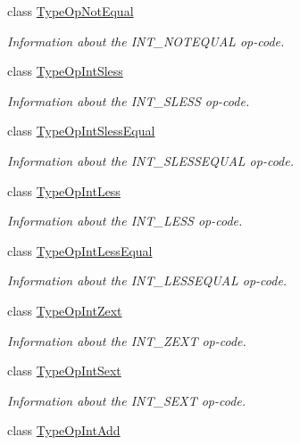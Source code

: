 \begin{DoxyCompactItemize}
class \mbox{\hyperlink{class_type_op_not_equal}{Type\+Op\+Not\+Equal}}
\begin{DoxyCompactList}\small\item\em Information about the I\+N\+T\+\_\+\+N\+O\+T\+E\+Q\+U\+AL op-\/code. \end{DoxyCompactList}\item 
class \mbox{\hyperlink{class_type_op_int_sless}{Type\+Op\+Int\+Sless}}
\begin{DoxyCompactList}\small\item\em Information about the I\+N\+T\+\_\+\+S\+L\+E\+SS op-\/code. \end{DoxyCompactList}\item 
class \mbox{\hyperlink{class_type_op_int_sless_equal}{Type\+Op\+Int\+Sless\+Equal}}
\begin{DoxyCompactList}\small\item\em Information about the I\+N\+T\+\_\+\+S\+L\+E\+S\+S\+E\+Q\+U\+AL op-\/code. \end{DoxyCompactList}\item 
class \mbox{\hyperlink{class_type_op_int_less}{Type\+Op\+Int\+Less}}
\begin{DoxyCompactList}\small\item\em Information about the I\+N\+T\+\_\+\+L\+E\+SS op-\/code. \end{DoxyCompactList}\item 
class \mbox{\hyperlink{class_type_op_int_less_equal}{Type\+Op\+Int\+Less\+Equal}}
\begin{DoxyCompactList}\small\item\em Information about the I\+N\+T\+\_\+\+L\+E\+S\+S\+E\+Q\+U\+AL op-\/code. \end{DoxyCompactList}\item 
class \mbox{\hyperlink{class_type_op_int_zext}{Type\+Op\+Int\+Zext}}
\begin{DoxyCompactList}\small\item\em Information about the I\+N\+T\+\_\+\+Z\+E\+XT op-\/code. \end{DoxyCompactList}\item 
class \mbox{\hyperlink{class_type_op_int_sext}{Type\+Op\+Int\+Sext}}
\begin{DoxyCompactList}\small\item\em Information about the I\+N\+T\+\_\+\+S\+E\+XT op-\/code. \end{DoxyCompactList}\item 
class \mbox{\hyperlink{class_type_op_int_add}{Type\+Op\+Int\+Add}}

\end{DoxyCompactItemize}
